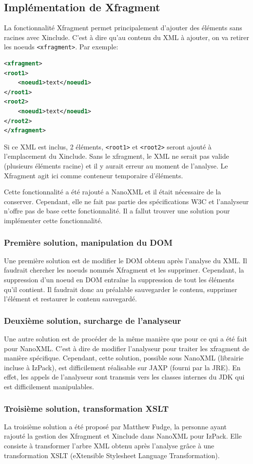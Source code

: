\subsection{Implémentation de Xfragment}
La fonctionnalité Xfragment permet principalement d'ajouter des éléments sans racines avec Xinclude.
C'est à dire qu'au contenu du XML à ajouter, on va retirer les noeuds \verb|<xfragment>|.
Par exemple:
\begin{lstlisting}[language=XML]
<xfragment>
<root1>
	<noeud1>text</noeud1>
</root1>
<root2>
	<noeud1>text</noeud1>
</root2>
</xfragment>
\end{lstlisting}
Si ce XML est inclus, 2 éléments, \verb|<root1>| et \verb|<root2>| seront ajouté à l'emplacement du Xinclude.
Sans le xfragment, le XML ne serait pas valide (plusieurs éléments racine) et il y aurait erreur au moment de l'analyse.
Le Xfragment agit ici comme conteneur temporaire d'éléments.

Cette fonctionnalité a été rajouté a NanoXML et il était nécessaire de la conserver.
Cependant, elle ne fait pas partie des spécifications W3C et l'analyseur n'offre pas de base cette fonctionnalité.
Il a fallut trouver une solution pour implémenter cette fonctionnalité.

\subsubsection{Première solution, manipulation du DOM}
Une première solution est de modifier le DOM obtenu après l'analyse du XML. 
Il faudrait chercher les noeuds nommés Xfragment et les supprimer.
Cependant, la suppression d'un noeud en DOM entraîne la suppression de tout les éléments qu'il contient.
Il faudrait donc au préalable sauvegarder le contenu, supprimer l'élément et restaurer le contenu sauvegardé.

\subsubsection{Deuxième solution, surcharge de l'analyseur}
Une autre solution est de procéder de la même manière que pour ce qui a été fait pour NanoXML.
C'est à dire de modifier l'analyseur pour traiter les xfragment de manière spécifique.
Cependant, cette solution, possible sous NanoXML (librairie incluse à IzPack), est difficilement réalisable sur JAXP (fourni par la JRE).
En effet, les appels de l'analyseur sont transmis vers les classes internes du JDK qui est difficilement manipulables.
\subsubsection{Troisième solution, transformation XSLT}
La troisième solution a été proposé par Matthew Fudge, la personne ayant rajouté la gestion des Xfragment et Xinclude dans NanoXML pour IzPack.
Elle consiste à transformer l'arbre XML obtenu après l'analyse grâce à une transformation XSLT (eXtensible Stylesheet Language Transformation).

